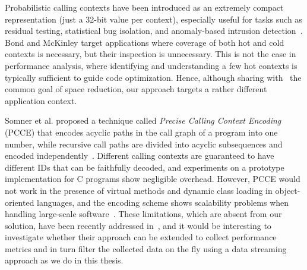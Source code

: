 Probabilistic calling contexts have been introduced as an extremely compact representation (just a 32-bit value per context), especially useful for tasks such as residual testing, statistical bug isolation, and anomaly-based intrusion detection~\cite{Bond07}. Bond and McKinley target applications where coverage of both hot and cold contexts is necessary, but their inspection is unnecessary. This is not the case in performance analysis, where identifying and understanding a few hot contexts is typically sufficient to guide code optimization. Hence, although sharing with~\cite{Bond07} the common goal of space reduction, our approach targets a rather different application context.

Somner et al. proposed a technique called {\em Precise Calling Context Encoding} (PCCE) that encodes acyclic paths in the call graph of a program into one number, while recursive call paths are divided into acyclic subsequences and encoded independently~\cite{Sumner10,Sumner12}. Different calling contexts are guaranteed to have different IDs that can be faithfully decoded, and experiments on a prototype implementation for C programs show negligible overhead. However, PCCE would not work in the presence of virtual methods and dynamic class loading in object-oriented languages, and the encoding scheme shows scalability problems when handling large-scale software~\cite{Bond10,Zeng14}. These limitations, which are absent from our solution, have been recently addressed in~\cite{Zeng14}, and it would be interesting to investigate whether their approach can be extended to collect performance metrics and in turn filter the collected data on the fly using a data streaming approach as we do in this thesis.

